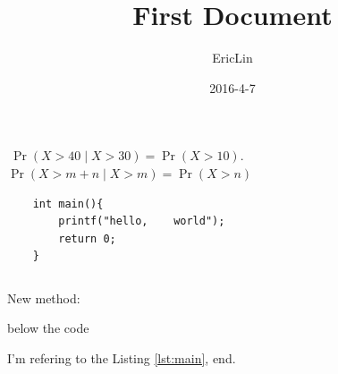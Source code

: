 \documentclass{article}
\title{First Document}
\date{2016-4-7}
\author{EricLin}
\begin{document}
$\mathrm{}\ \Pr(X>40 \mid X>30)= \Pr(X>10).$
$\Pr(X>m+n \mid X>m)=\Pr(X>n)$
\newpage

\maketitle
\begin{verbatim}
	int main(){
		printf("hello,    world");
		return 0;
	}
\end{verbatim}


\inputminted{cpp}{main.cpp}


New method:
\begin{listing}[H]
	\caption{below the code}
	\label{lst:previous-main}
\end{listing}

I'm refering to the Listing \ref{lst:main}, end.
\end{document}

